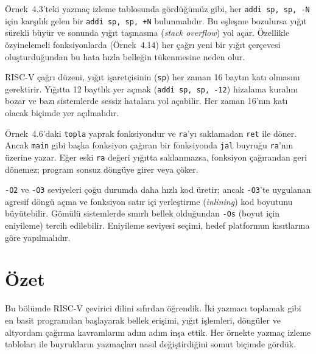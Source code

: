 
Örnek~4.3'teki yazmaç izleme tablosunda gördüğümüz gibi, her \texttt{addi sp, sp, -N} için karşılık gelen bir \texttt{addi sp, sp, +N} bulunmalıdır. Bu eşleşme bozulursa yığıt sürekli büyür ve sonunda yığıt taşmasına (\emph{stack overflow}) yol açar. Özellikle özyinelemeli fonksiyonlarda (Örnek~4.14) her çağrı yeni bir yığıt çerçevesi oluşturduğundan bu hata hızla belleğin tükenmesine neden olur.


RISC-V çağrı düzeni, yığıt işaretçisinin (\texttt{sp}) her zaman 16 baytın katı olmasını gerektirir. Yığıtta 12 baytlık yer açmak (\texttt{addi sp, sp, -12}) hizalama kuralını bozar ve bazı sistemlerde sessiz hatalara yol açabilir. Her zaman 16'nın katı olacak biçimde yer açılmalıdır.


Örnek~4.6'daki \texttt{topla} yaprak fonksiyondur ve \texttt{ra}'yı saklamadan \texttt{ret} ile döner. Ancak \texttt{main} gibi başka fonksiyon çağıran bir fonksiyonda \texttt{jal} buyruğu \texttt{ra}'nın üzerine yazar. Eğer eski \texttt{ra} değeri yığıtta saklanmazsa, fonksiyon çağırandan geri dönemez; program sonsuz döngüye girer veya çöker.


\texttt{-O2} ve \texttt{-O3} seviyeleri çoğu durumda daha hızlı kod üretir; ancak \texttt{-O3}'te uygulanan agresif döngü açma ve fonksiyon satır içi yerleştirme (\emph{inlining}) kod boyutunu büyütebilir. Gömülü sistemlerde sınırlı bellek olduğundan \texttt{-Os} (boyut için eniyileme) tercih edilebilir. Eniyileme seviyesi seçimi, hedef platformun kısıtlarına göre yapılmalıdır.


\section{Özet}
\label{sec:ozet-programlama}

Bu bölümde RISC-V çevirici dilini sıfırdan öğrendik. İki yazmacı toplamak gibi en basit programdan başlayarak bellek erişimi, yığıt işlemleri, döngüler ve altyordam çağırma kavramlarını adım adım inşa ettik. Her örnekte yazmaç izleme tabloları ile buyrukların yazmaçları nasıl değiştirdiğini somut biçimde gördük.


